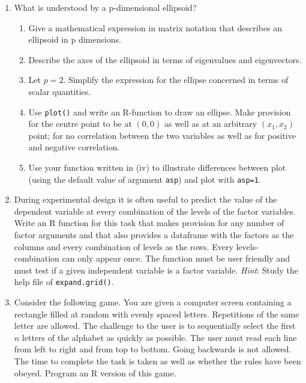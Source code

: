 \documentclass[
]{book}
\begin{document}
\begin{enumerate}
\def\labelenumi{\arabic{enumi}.}
\setcounter{enumi}{10}
\item
  What is understood by a p-dimensional ellipsoid?

  \begin{enumerate}
  \def\labelenumii{(\roman{enumii})}
  \item
    Give a mathematical expression in matrix notation that describes an ellipsoid in p dimensions.
  \item
    Describe the axes of the ellipsoid in terms of eigenvalues and eigenvectors.
  \item
    Let \(p = 2\). Simplify the expression for the ellipse concerned in terms of scalar quantities.
  \item
    Use \texttt{plot()} and write an R-function to draw an ellipse. Make provision for the centre point to be at \((0, 0)\) as well as at an arbitrary \((x_1,x_2)\) point; for no correlation between the two variables as well as for positive and negative correlation.
  \item
    Use your function written in (iv) to illustrate differences between plot (using the default value of argument \texttt{asp}) and plot with \texttt{asp=1}.
  \end{enumerate}
\item
  During experimental design it is often useful to predict the value of the dependent variable at every combination of the levels of the factor variables. Write an R function for this task that makes provision for any number of factor arguments and that also provides a dataframe with the factors as the columns and every combination of levels as the rows. Every levels-combination can only appear once. The function must be user friendly and must test if a given independent variable is a factor variable. \emph{Hint}: Study the help file of \texttt{expand.grid()}.
\item
  Consider the following game. You are given a computer screen containing a rectangle filled at random with evenly spaced letters. Repetitions of the same letter are allowed. The challenge to the user is to sequentially select the first \(n\) letters of the alphabet as quickly as possible. The user must read each line from left to right and from top to bottom. Going backwards is not allowed. The time to complete the task is taken as well as whether the rules have been obeyed. Program an R version of this game.
\end{enumerate}
\end{document}
